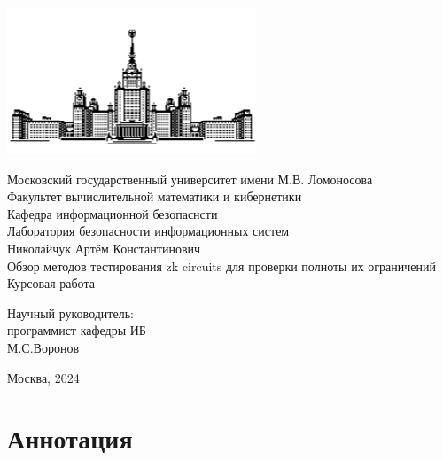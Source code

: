 \documentclass[a4paper]{article}
\begin{document}
 
\begin{center}
\includegraphics{MSU}

\hfill \break
\normalsize{Московский государственный университет имени М.В. Ломоносова}\\
\normalsize{Факультет вычислительной математики и кибернетики}\\
\normalsize{Кафедра информационной безопаснсти}\\
\normalsize{Лаборатория безопасности информационных систем}\\
 \hfill \break
\normalsize{Николайчук Артём Константинович}\\
\hfill\break
\hfill \break
\hfill \break
\hfill \break
\large{Обзор методов тестирования zk circuits для проверки полноты их ограничений}\\
\hfill \break
\hfill \break
\hfill \break
\normalsize{Курсовая работа}\\
\hfill \break
\hfill \break
\hfill \break
\hfill \break
\hfill \break
\hfill \break
\hfill \break
\hfill \break
\begin{flushright}
    \normalsize{Научный руководитель:}\\
    \normalsize{программист кафедры ИБ}\\
    \normalsize{М.С.Воронов}\\
\end{flushright}
\end{center}
\vspace*{\fill}
\begin{center} Москва, 2024 \end{center}
\thispagestyle{empty}
 
\newpage
\section*{Аннотация}
\indent
\end{document}

